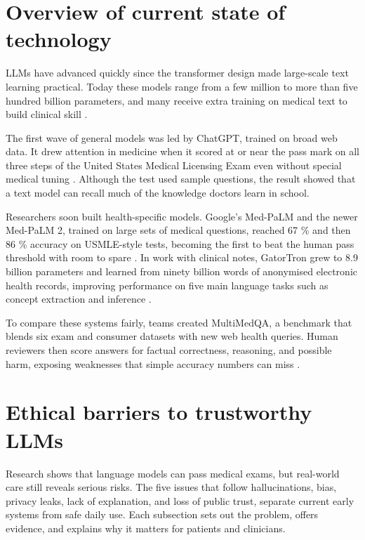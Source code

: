 \documentclass[12pt,a4paper]{scrreprt}
\begin{document}
\section*{Overview of current state of technology}
LLMs have advanced quickly since the transformer design made large-scale text learning practical. Today these models range from a few million to more than five hundred billion parameters, and many receive extra training on medical text to build clinical skill \autocite{Survey}.\par
\vspace{\baselineskip}
\noindent
The first wave of general models was led by ChatGPT, trained on broad web data. It drew attention in medicine when it scored at or near the pass mark on all three steps of the United States Medical Licensing Exam even without special medical tuning \autocite{ChatGPT}. Although the test used sample questions, the result showed that a text model can recall much of the knowledge doctors learn in school.\par
\vspace{\baselineskip}
\noindent
Researchers soon built health-specific models. Google’s Med-PaLM and the newer Med-PaLM 2, trained on large sets of medical questions, reached 67 \% and then 86 \% accuracy on USMLE-style tests, becoming the first to beat the human pass threshold with room to spare \autocite{MedPalm}. In work with clinical notes, GatorTron grew to 8.9 billion parameters and learned from ninety billion words of anonymised electronic health records, improving performance on five main language tasks such as concept extraction and inference \autocite{LLM}.\par
\vspace{\baselineskip}
\noindent
To compare these systems fairly, teams created MultiMedQA, a benchmark that blends six exam and consumer datasets with new web health queries. Human reviewers then score answers for factual correctness, reasoning, and possible harm, exposing weaknesses that simple accuracy numbers can miss \autocite{LLM2}.

\section*{Ethical barriers to trustworthy LLMs}
Research shows that language models can pass medical exams, but real-world care still reveals serious risks. The five issues that follow hallucinations, bias, privacy leaks, lack of explanation, and loss of public trust, separate current early systems from safe daily use. Each subsection sets out the problem, offers evidence, and explains why it matters for patients and clinicians.
\end{document}
